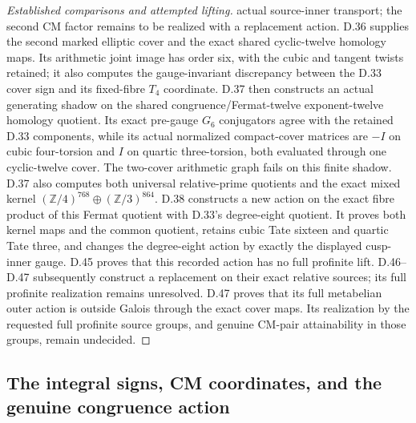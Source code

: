 \begin{proof}[Established comparisons and attempted lifting]
actual source-inner transport; the second CM factor remains to be realized with a replacement action. D.36 supplies the second marked elliptic cover and the exact shared cyclic-twelve homology maps. Its arithmetic joint image has order six, with the cubic and tangent twists retained; it also computes the gauge-invariant discrepancy between the D.33 cover sign and its fixed-fibre $T_4$ coordinate. D.37 then constructs an actual generating shadow on the shared congruence/Fermat-twelve exponent-twelve homology quotient. Its exact pre-gauge $G_6$ conjugators agree with the retained D.33 components, while its actual normalized compact-cover matrices are $-I$ on cubic four-torsion and $I$ on quartic three-torsion, both evaluated through one cyclic-twelve cover. The two-cover arithmetic graph fails on this finite shadow. D.37 also computes both universal relative-prime quotients and the exact mixed kernel $(\mathbb Z/4)^{768}\oplus(\mathbb Z/3)^{864}$. D.38 constructs a new action on the exact fibre product of this Fermat quotient with D.33's degree-eight quotient. It proves both kernel maps and the common quotient, retains cubic Tate sixteen and quartic Tate three, and changes the degree-eight action by exactly the displayed cusp-inner gauge. D.45 proves that this recorded action has no full profinite lift. D.46--D.47 subsequently construct a replacement on their exact relative sources; its full profinite realization remains unresolved. D.47 proves that its full metabelian outer action is outside Galois through the exact cover maps. Its realization by the requested full profinite source groups, and genuine CM-pair attainability in those groups, remain undecided.
\end{proof}

\subsection{The integral signs, CM coordinates, and the genuine congruence action}

